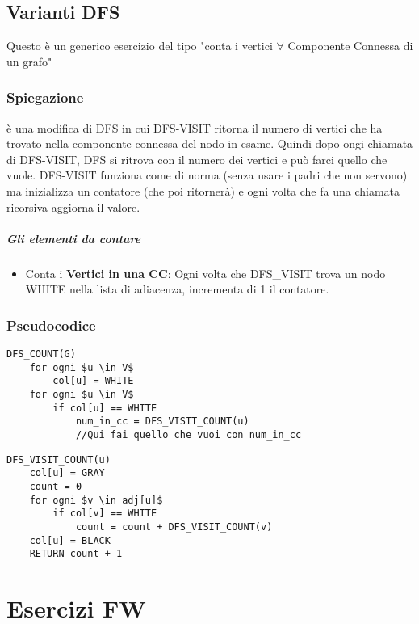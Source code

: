 \documentclass[12pt, a4paper, openany]{book}
\begin{document}
\section{Varianti DFS}
Questo è un generico esercizio del tipo "conta i vertici $\forall$ Componente Connessa di un grafo"

\subsection*{Spiegazione}
è una modifica di DFS in cui DFS-VISIT ritorna il numero di vertici che ha trovato nella componente connessa
del nodo in esame. Quindi dopo ongi chiamata di DFS-VISIT, DFS si ritrova con il numero dei vertici e può farci quello che vuole.
DFS-VISIT funziona come di norma (senza usare i padri che non servono) ma inizializza un contatore (che poi ritornerà) e ogni volta
che fa una chiamata ricorsiva aggiorna il valore.

\paragraph*{Gli elementi da contare}
\begin{itemize}
	\item Conta i \textbf{Vertici in una CC}: Ogni volta che DFS\_VISIT trova un nodo WHITE nella lista di adiacenza, incrementa di 1 il contatore. 
\end{itemize}

\subsection*{Pseudocodice}

\begin{lstlisting}[mathescape=true]
DFS_COUNT(G)
    for ogni $u \in V$
        col[u] = WHITE
    for ogni $u \in V$
        if col[u] == WHITE
            num_in_cc = DFS_VISIT_COUNT(u)
            //Qui fai quello che vuoi con num_in_cc 
\end{lstlisting}

\begin{lstlisting}[mathescape=true]
DFS_VISIT_COUNT(u)
    col[u] = GRAY
    count = 0
    for ogni $v \in adj[u]$
        if col[v] == WHITE
            count = count + DFS_VISIT_COUNT(v)
    col[u] = BLACK
    RETURN count + 1
\end{lstlisting}

\chapter{Esercizi FW}
\end{document}

